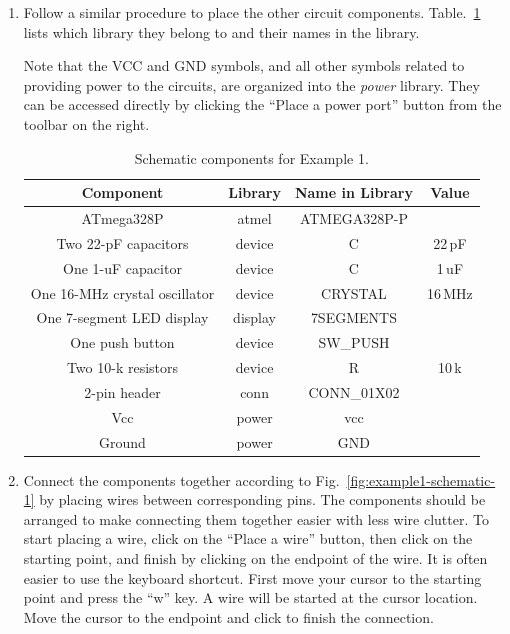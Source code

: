 \documentclass[12pt,letterpaper]{scrartcl}
\begin{document}
\begin{enumerate}
	\item Follow a similar procedure to place the other circuit components. Table.~\ref{tab:example1-sche} lists which library they belong to and their names in the library. 
	
	Note that the VCC and GND symbols, and all other symbols related to providing power to the circuits, are organized into the \emph{power} library. They can be accessed directly by clicking the ``Place a power port'' button from the toolbar on the right. 
	
		\begin{table}[ht]
			\centering
			\caption{Schematic components for Example 1.}
			\renewcommand{\arraystretch}{1.2}
			\begin{tabular}{|c|c|c|c|}
			\hline \textbf{Component} & \textbf{Library} & \textbf{Name in Library} & \textbf{Value} \\
			\hline 
			\hline ATmega328P & atmel & ATMEGA328P-P & \\
			\hline Two 22-pF capacitors & device & C & 22\,pF \\ 
			\hline One 1-uF capacitor & device & C & 1\,uF \\ 
			\hline One 16-MHz crystal oscillator & device & CRYSTAL & 16\,MHz \\ 
			\hline One 7-segment LED display & display & 7SEGMENTS &  \\ 
			\hline One push button & device & SW\_PUSH &  \\ 
			\hline Two 10-k resistors & device & R & 10\,k \\ 
			\hline 2-pin header &  conn & CONN\_01X02 &  \\ 
			\hline Vcc & power & vcc &  \\ 
			\hline Ground & power & GND &  \\ 
			\hline 
			\end{tabular}
			\label{tab:example1-sche}
		\end{table}
	\item Connect the components together according to Fig.~\ref{fig:example1-schematic-1} by placing wires between corresponding pins. The components should be arranged to make connecting them together easier with less wire clutter. To start placing a wire, click on the ``Place a wire'' button, then click on the starting point, and finish by clicking on the endpoint of the wire. It is often easier to use the keyboard shortcut. First move your cursor to the starting point and press the ``w'' key. A wire will be started at the cursor location. Move the cursor to the endpoint and click to finish the connection. 
	

\end{enumerate}
\end{document}
